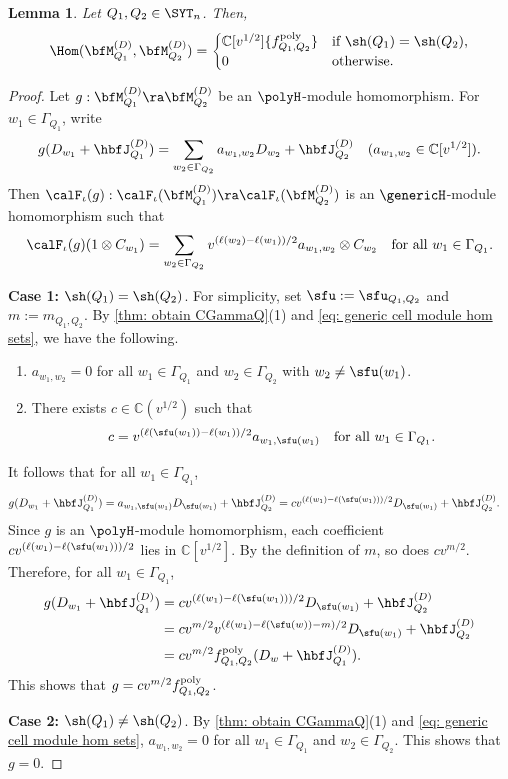 \documentclass[12pt, reqno]{amsart}
\theoremstyle{plain}
\newtheorem{lemma}[lemma]{Lemma}
\theoremstyle{definition}
\numberwithin{equation}{section}
\numberwithin{figure}{section}
\numberwithin{table}{section}
\def\C{\mathbb C}
\begin{document}
\begin{lemma}\label{thm: Hom set of MdQ and MdQp}
Let $Q_1, Q_2 \in \SYT_n$.
Then,
\[
\Hom(\bfM^{(D)}_{Q_1}, \bfM^{(D)}_{Q_2}) = \begin{cases}
\C[v^{1/2}] \{f^{\rm poly}_{Q_1, Q_2} \}    & \text{if $\sh(Q_1) = \sh(Q_2)$,}\\
0    & \text{otherwise.}
\end{cases}
\]
\end{lemma}
\begin{proof}
Let $g: \bfM^{(D)}_{Q_1} \ra \bfM^{(D)}_{Q_2}$ be an $\polyH$-module homomorphism.
For $w_1 \in \Gamma_{Q_1}$, write
\[
g(D_{w_1} + \hbfJ^{(D)}_{Q_1}) = \sum_{w_2 \in \Gamma_{Q_2}} a_{w_1, w_2} D_{w_2} + \hbfJ^{(D)}_{Q_2} \quad(a_{w_1, w_2} \in \C[v^{1/2}]).
\]
Then $\calF_\iota(g): \calF_\iota(\bfM^{(D)}_{Q_1})  \ra \calF_\iota(\bfM^{(D)}_{Q_2})$ is an $\genericH$-module homomorphism such that
\[
\calF_\iota(g) ( 1 \otimes C_{w_1}) = \sum_{w_2 \in \Gamma_{Q_2}} v^{(\ell(w_2) - \ell(w_1))/2} a_{w_1, w_2} \otimes C_{w_2} \quad \text{for all $w_1 \in \Gamma_{Q_1}$.}
\]

{\bf Case 1:} $\sh(Q_1) = \sh(Q_2)$.
For simplicity,
set $\sfu := \sfu_{Q_1, Q_2}$ and $m := m_{Q_1, Q_2}$. 
By \cref{thm: obtain CGammaQ}(1) and \cref{eq: generic cell module hom sets}, 
we have the following.
\begin{enumerate}[label = $\bullet$]
    \item $a_{w_1, w_2} = 0$ for all $w_1 \in \Gamma_{Q_1}$ and $w_2 \in \Gamma_{Q_2}$ with $w_2 \neq \sfu(w_1)$.
    \item There exists  $c \in \C(v^{1/2})$ such that
    \[
    c = v^{(\ell(\sfu(w_1)) - \ell(w_1))/2}a_{w_1, \sfu(w_1)} \quad\text{for all $w_1 \in \Gamma_{Q_1}$.}
    \]
\end{enumerate}
It follows that for all $w_1 \in \Gamma_{Q_1}$,
\begin{align*}
g(D_{w_1} + \hbfJ^{(D)}_{Q_1}) 
&= a_{w_1, \sfu(w_1)} D_{\sfu(w_1)} + \hbfJ^{(D)}_{Q_2} =  cv^{(\ell(w_1) - \ell(\sfu(w_1)))/2}  D_{\sfu(w_1)} + \hbfJ^{(D)}_{Q_2}.
\end{align*}
Since $g$ is an $\polyH$-module homomorphism, each coefficient $c v^{(\ell(w_1) - \ell(\sfu(w_1)))/2}$ lies in $\C[v^{1/2}]$. 
By the definition of $m$, so does $c v^{m/2}$.
Therefore, for all $w_1 \in \Gamma_{Q_1}$, 
\begin{align*}
g(D_{w_1} + \hbfJ^{(D)}_{Q_1}) 
&=  c v^{(\ell(w_1) - \ell(\sfu(w_1)))/2}  D_{\sfu(w_1)} + \hbfJ^{(D)}_{Q_2} \\
&= cv^{m/2} v^{(\ell(w_1) - \ell(\sfu(w)) -m)/2}  D_{\sfu(w_1)} + \hbfJ^{(D)}_{Q_2}\\
&= cv^{m/2} f^{\rm poly}_{Q_1, Q_2}(D_w + \hbfJ^{(D)}_{Q_1}).
\end{align*}
This shows that $g = cv^{m/2} f^{\rm poly}_{Q_1, Q_2}$. 

{\bf Case 2: }$\sh(Q_1) \neq \sh(Q_2)$.
By \cref{thm: obtain CGammaQ}(1) and \cref{eq: generic cell module hom sets},
$a_{w_1, w_2} = 0$ for all $w_1 \in \Gamma_{Q_1}$ and $w_2 \in \Gamma_{Q_2}$.
This shows that $g = 0$.
\end{proof}
\end{document}

